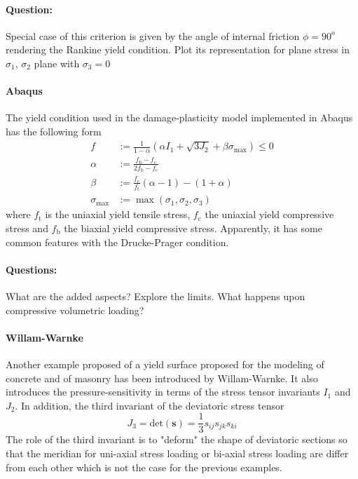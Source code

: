 \documentclass[main.tex]{subfiles}
\begin{document}
\paragraph{Question:} Special case of this criterion is given by the angle of internal friction $\phi = 90^o$ rendering the Rankine yield condition. Plot its representation for plane stress in $\sigma_1$, $\sigma_2$ plane with $\sigma_3 = 0$

\paragraph{Abaqus}
The yield condition used in the damage-plasticity model implemented in Abaqus has the following form
\begin{align}
\label{EQ:Abaqus}
f & :=   
\frac{1}{1-\alpha}
(\alpha I_1 + \sqrt{3 J_2} + \beta \sigma_{\max}) \leq 0 \\
\alpha &:=
\frac{f_\mathrm{b} - f_\mathrm{c}}{2f_\mathrm{b} - f_\mathrm{c}} \nonumber \\
\beta & :=  
\frac{f_\mathrm{c}}{f_\mathrm{t}}(\alpha-1) - (1+\alpha) \nonumber \\
\sigma_{\max} & :=  \max(\sigma_1, \sigma_2, \sigma_3) \nonumber
\end{align}
where  $ f_\mathrm{t} $ is the uniaxial yield tensile stress, $f_\mathrm{c}$ the uniaxial yield compressive stress and $f_\mathrm{b}$ the biaxial yield compressive stress.
Apparently, it has some common features with the Drucke-Prager condition. 
\paragraph{Questions:} What are the added aspects? Explore the limits. What happens upon compressive volumetric loading?

\paragraph{Willam-Warnke}

Another example proposed of a yield surface proposed for the modeling of concrete and of masonry has been introduced by Willam-Warnke. It also introduces the pressure-sensitivity in terms of the stress tensor invariants $I_1$ and $J_2$. In addition, the third invariant of the deviatoric stress tensor
\[
 J_3 = \mathrm{det}(\boldsymbol{s}) = 
 \frac{1}{3} s_{ij} s_{jk} s_{ki}
\]
The role of the third invariant is to "deform" the shape of deviatoric sections so that the meridian for uni-axial stress loading or bi-axial stress loading are differ from each other which is not the case for the previous examples.
\end{document}
